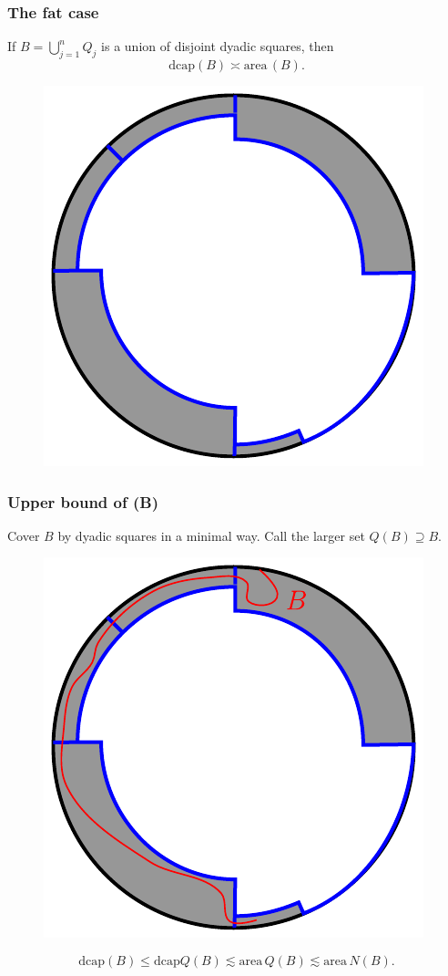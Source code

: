\documentclass[xcolor=pdftex,dvipsnames,table]{beamer}
\newcommand{\area}{\text{area}\,}
\newcommand{\dcap}{\text{dcap}}
\theoremstyle{definition}
\begin{document}
\begin{frame}
  \frametitle{The fat case}
  \begin{lemma}
    If $B = \bigcup_{j=1}^n Q_j$ is a union of disjoint dyadic squares, then
    \[
        \dcap(B) \asymp \area(B).
    \]
  \end{lemma}
  \begin{figure}
    \includegraphics[scale=0.6]{fatCase.pdf}
  \end{figure}
\end{frame}

\begin{frame}
  \frametitle{Upper bound of \dcap(B)}
  Cover $B$ by dyadic squares in a minimal way. Call the larger set $Q(B) \supseteq B$.
  \begin{figure}
      \includegraphics[scale=0.6]{Q(B).pdf}
  \end{figure}
  \[
      \dcap(B) \leq \dcap Q(B) \lesssim \area Q(B) \lesssim \area N(B).
  \]
\end{frame}
\end{document}
